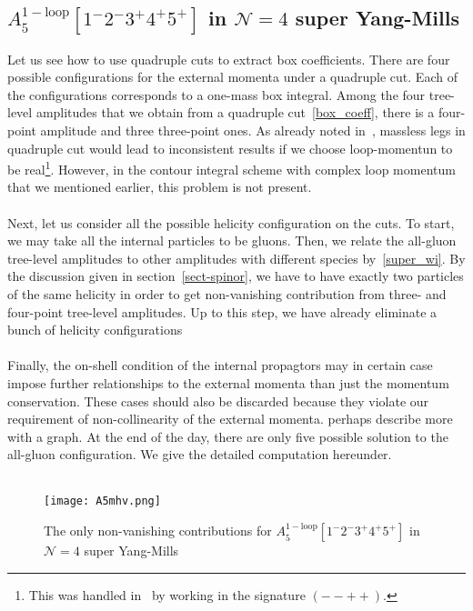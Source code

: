 \subsection{$A_5^{\mathrm{1-loop}}[1^-2^-3^+4^+5^+]$ in $\mathcal{N}=4$ super Yang-Mills}
Let us see how to use quadruple cuts to extract box coefficients. 
There are four possible configurations for the external momenta under a quadruple cut.
Each of the configurations corresponds to a one-mass box integral.
Among the four tree-level amplitudes that we obtain from a quadruple cut~\cref{box_coeff}, there is a four-point amplitude and three three-point ones.
As already noted in~\cite{Britto:2004nc}, massless legs in quadruple cut would lead to inconsistent results if we choose loop-momentun to be real\footnote{This was handled in~\cite{Britto:2004nc} by working in the signature $(--++)$.}. 
However, in the contour integral scheme with complex loop momentum that we mentioned earlier, this problem is not present.
\\\\
Next, let us consider all the possible helicity configuration on the cuts.
To start, we may take all the internal particles to be gluons. 
Then, we relate the all-gluon tree-level amplitudes to other amplitudes with different species by~\cref{super_wi}. 
By the discussion given in section~\ref{sect-spinor}, we have to have exactly two particles of the same helicity in order to get non-vanishing contribution from three- and four-point tree-level amplitudes.
Up to this step, we have already eliminate a bunch of helicity configurations
\\\\
Finally, the on-shell condition of the internal propagtors may in certain case impose further relationships to the external momenta than just the momentum conservation.
These cases should also be discarded because they violate our requirement of non-collinearity of the external momenta. 
\color{red}perhaps describe more with a graph.\color{black}
At the end of the day, there are only five possible solution to the all-gluon configuration.
We give the detailed computation hereunder.
\\\\
\begin{figure}[h]
  \centering
  \texttt{[image: A5mhv.png]}
  \caption{The only non-vanishing contributions for $A_5^{\mathrm{1-loop}}[1^-2^-3^+4^+5^+]$ in $\mathcal{N}=4$ super Yang-Mills}
  \label{fig-cutkosky}
\end{figure}
